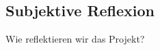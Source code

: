 \subsection{Subjektive Reflexion}
\label{sec:SubjektiveReflexion}

Wie reflektieren wir das Projekt?